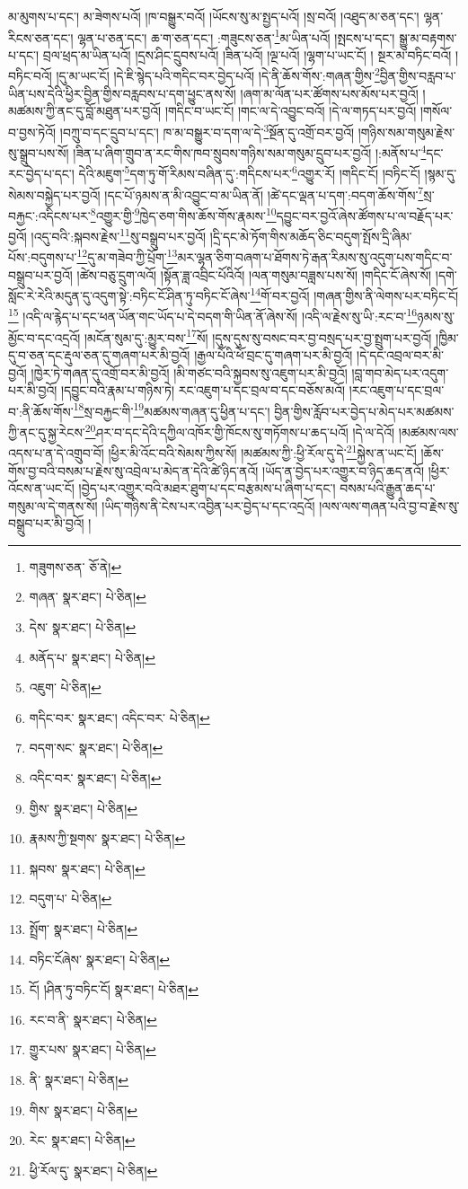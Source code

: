 མ་མུགས་པ་དང་། མ་ཟེགས་པའོ། །ཁ་བསྒྱུར་བའོ། །ཡོངས་སུ་མ་སྤྱད་པའོ། །སྲ་བའོ། །འཐུད་མ་ཅན་དང་། ལྷན་རིངས་ཅན་དང་། ལྷན་པ་ཅན་དང་། ཆ་ག་ཅན་དང་། :གཟུངས་ཅན་\footnote{གཟུགས་ཅན་  ཅོ་ནེ། }མ་ཡིན་པའོ། །སྤངས་པ་དང་། སྒྱུ་མ་བརྟགས་པ་དང་། བྲལ་ཕྲད་མ་ཡིན་པའོ། །དྲས་ཤིང་དྲུབས་པའོ། །ཟིན་པའོ། །ལྔ་པའོ། །ལྷག་པ་ཡང་ངོ། །
སྔར་མ་བཏིང་བའོ། །བཏིང་བའོ། །དུ་མ་ཡང་ངོ། །དེ་ཇི་སྙེད་པའི་གདིང་བར་བྱེད་པའོ། །དེ་ནི་ཆོས་གོས་:གཞན་གྱིས་\footnote{གཞན་  སྣར་ཐང་།  པེ་ཅིན། }བྱིན་གྱིས་བརླབ་པ་ཡིན་པས་དེའི་ཕྱིར་བྱིན་གྱིས་བརླབས་པ་དག་ཕྱུང་ནས་སོ། །ཞག་མ་ལོན་པར་ཚོགས་པས་མོས་པར་བྱའོ། །མཚམས་ཀྱི་ནང་དུ་བློ་མཐུན་པར་བྱའོ། །གདིང་བ་ཡང་ངོ། །གང་ལ་དེ་འབྱུང་བའོ། །དེ་ལ་གཏད་པར་བྱའོ། །གསོལ་བ་བྱས་ཏེའོ། །བཀྲུ་བ་དང་དྲུབ་པ་དང་། ཁ་མ་བསྒྱུར་བ་དག་ལ་དེ་\footnote{དེས་  སྣར་ཐང་།  པེ་ཅིན། }སྔོན་དུ་འགྲོ་བར་བྱའོ། །གཉིས་སམ་གསུམ་རྗེས་སུ་སྒྲུབ་པས་སོ། །ཟིན་པ་ཞིག་གྲུབ་ན་རང་གིས་ཁབ་སྲུབས་གཉིས་སམ་གསུམ་དྲུབ་པར་བྱའོ། །:མནོས་པ་\footnote{མནོད་པ་  སྣར་ཐང་།  པེ་ཅིན། }དང་རང་བྱེད་པ་དང་། དེའི་མཇུག་\footnote{འཇུག་  པེ་ཅིན། }དག་ཏུ་གོ་རིམས་བཞིན་དུ་:གདིངས་པར་\footnote{གདིང་བར་  སྣར་ཐང་། འདིང་བར་  པེ་ཅིན། }འགྱུར་རོ། །གདིང་ངོ། །བཏིང་ངོ། །སྙམ་དུ་སེམས་བསྐྱེད་པར་བྱའོ། །དང་པོ་ཉམས་ན་མི་འབྱུང་བ་མ་ཡིན་ནོ། །ཚེ་དང་ལྡན་པ་དག་:བདག་ཆོས་གོས་\footnote{བདག་སང་  སྣར་ཐང་།  པེ་ཅིན། }སྲ་བརྐྱང་:འདིངས་པར་\footnote{འདིང་བར་  སྣར་ཐང་།  པེ་ཅིན། }འགྱུར་གྱི་\footnote{གྱིས་  སྣར་ཐང་།  པེ་ཅིན། }ཁྱེད་ཅག་གིས་ཆོས་གོས་རྣམས་\footnote{རྣམས་ཀྱི་སྔགས་  སྣར་ཐང་།  པེ་ཅིན། }དབྱུང་བར་བྱའོ་ཞེས་ཚོགས་པ་ལ་བརྗོད་པར་བྱའོ། །འདུ་བའི་:སྐབས་རྗེས་\footnote{སྐབས་  སྣར་ཐང་།  པེ་ཅིན། }སུ་བསྒྲུབ་པར་བྱའོ། །དྲི་དང་མེ་ཏོག་གིས་མཆོད་ཅིང་བདུག་སྤོས་དྲི་ཞིམ་པོས་:བདུགས་པ་\footnote{བདུག་པ་  པེ་ཅིན། }དུ་མ་གཟེབ་ཀྱི་པྲོག་\footnote{སྤྲོག་  སྣར་ཐང་།  པེ་ཅིན། }མར་ལྷན་ཅིག་བཞག་པ་ཐོགས་ཏེ་རྒན་རིམས་སུ་འདུག་པས་གདིང་བ་བསྒྲུབ་པར་བྱའོ། །ཚེས་བཅུ་དྲུག་ལའོ། །སྟོན་ཟླ་འབྲིང་པོའིའོ། །ལན་གསུམ་བཟླས་པས་སོ། །གདིང་ངོ་ཞེས་སོ། །དགེ་སློང་རེ་རེའི་མདུན་དུ་འདུག་སྟེ་:བཏིང་ངོ་ཤིན་ཏུ་བཏིང་ངོ་ཞེས་\footnote{བཏིང་ངོཞེས་  སྣར་ཐང་།  པེ་ཅིན། }གོ་བར་བྱའོ། །གཞན་གྱིས་ནི་ལེགས་པར་བཏིང་ངོ།\footnote{ངོ། །ཤིན་ཏུ་བཏིང་ངོ།  སྣར་ཐང་།  པེ་ཅིན། } །འདི་ལ་རྙེད་པ་དང་ཕན་ཡོན་གང་ཡོད་པ་དེ་བདག་གི་ཡིན་ནོ་ཞེས་སོ། །འདི་ལ་རྗེས་སུ་ཡི་:རང་བ་\footnote{རང་བ་ནི་  སྣར་ཐང་།  པེ་ཅིན། }ཉམས་སུ་མྱོང་བ་དང་འདྲའོ། །མངོན་སུམ་དུ་:མྱུར་བས་\footnote{གྱུར་པས་  སྣར་ཐང་།  པེ་ཅིན། }སོ། །དུས་དུས་སུ་བསང་བར་བྱ་བསྲད་པར་བྱ་སྤྲུག་པར་བྱའོ། །ཁྱིམ་དུ་བ་ཅན་དང་རྡུལ་ཅན་དུ་གཞག་པར་མི་བྱའོ། །རྒྱལ་པོའི་ཕོ་བྲང་དུ་གཞག་པར་མི་བྱའོ། །དེ་དང་འབྲལ་བར་མི་བྱའོ། །ཁྱེར་ཏེ་གཞན་དུ་འགྲོ་བར་མི་བྱའོ། །མི་གཙང་བའི་སྐྱབས་སུ་འཇུག་པར་མི་བྱའོ། །བླ་གབ་མེད་པར་འདུག་པར་མི་བྱའོ། །དབྱུང་བའི་རྣམ་པ་གཉིས་ཏེ། རང་འཇུག་པ་དང་བྲལ་བ་དང་བཅོས་མའོ། །རང་འཇུག་པ་དང་བྲལ་བ་:ནི་ཆོས་གོས་\footnote{ནི་  སྣར་ཐང་།  པེ་ཅིན། }སྲ་བརྐྱང་གི་\footnote{གིས་  སྣར་ཐང་།  པེ་ཅིན། }མཚམས་གཞན་དུ་ཕྱིན་པ་དང་། བྱིན་གྱིས་རློབ་པར་བྱེད་པ་མེད་པར་མཚམས་ཀྱི་ནང་དུ་སྐྱ་རེངས་\footnote{རེང་  སྣར་ཐང་།  པེ་ཅིན། }ཤར་བ་དང་དེའི་དཀྱིལ་འཁོར་གྱི་ཁོངས་སུ་གཏོགས་པ་ཆད་པའོ། །དེ་ལ་དེའོ། །མཚམས་ལས་འདས་པ་ན་དེ་འགྲུབ་བོ། །ཕྱིར་མི་འོང་བའི་སེམས་ཀྱིས་སོ། །མཚམས་ཀྱི་:ཕྱི་རོལ་དུ་དེ་\footnote{ཕྱི་རོལ་དུ་  སྣར་ཐང་།  པེ་ཅིན། }སྐྱེས་ན་ཡང་ངོ། །ཆོས་གོས་བྱ་བའི་བསམ་པ་རྗེས་སུ་འབྲེལ་པ་མེད་ན་དེའི་ཚེ་ཉིད་ནའོ། །ཡོད་ན་བྱེད་པར་འགྱུར་བ་ཉིད་ཆད་ནའོ། །ཕྱིར་འོངས་ན་ཡང་ངོ། །བྱེད་པར་འགྱུར་བའི་མཐར་ཐུག་པ་དང་བརྩམས་པ་ཞིག་པ་དང་། བསམ་པའི་རྒྱུན་ཆད་པ་གསུམ་ལ་དེ་གནས་སོ། །ཡིད་གཉིས་ནི་ངེས་པར་འབྱིན་པར་བྱེད་པ་དང་འདྲའོ། །ལས་ལས་གཞན་པའི་བྱ་བ་རྗེས་སུ་བསྒྲུབ་པར་མི་བྱའོ། །
